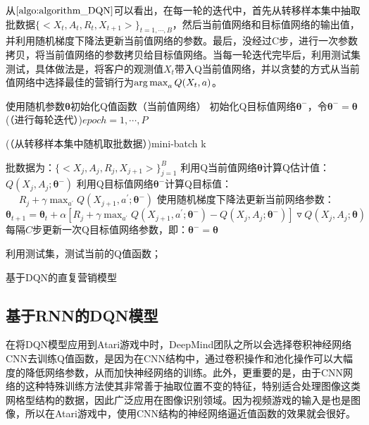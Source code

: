 从$\ref{algo:algorithm_DQN}$可以看出，在每一轮的迭代中，首先从转移样本集中抽取批数据$\{<X_{t}, A_{t}, R_{t}, X_{t+1}>\}_{t=1,\cdots,B}$，然后当前值网络和目标值网络的输出值，并利用随机梯度下降法更新当前值网络的参数。最后，没经过C步，进行一次参数拷贝，将当前值网络的参数拷贝给目标值网络。当每一轮迭代完毕后，利用测试集测试，具体做法是，将客户的观测值$X_{t}$带入Q当前值网络，并以贪婪的方式从当前值网络中选择最佳的营销行为$\operatorname*{arg\,max}_{a}Q(X_{t},a)$。

\begin{algorithm}[htbp]
 \small
 \SetAlgoLined

 使用随机参数$\bm{\theta}$初始化Q值函数（当前值网络）\;
 初始化Q目标值网络$\bm{\theta}^{-}$，令$\bm{\theta}^{-}=\bm{\theta}$\;
 \For(（进行每轮迭代）){$epoch=1,\cdots, P$}{
  \For(（从转移样本集中随机取批数据）){mini-batch k}{

    批数据为：$\{<X_{j}, A_{j}, R_{j}, X_{j+1}>\}_{j=1}^{B}$\;
    利用Q当前值网络$\bm{\theta}$计算Q估计值：$Q(X_{j}, A_{j};\bm{\theta}^{-})$\;
    利用Q目标值网络$\bm{\theta}^{-}$计算Q目标值：\\
     $\quad$ $R_{j}+\gamma \max_{a^{'}}Q(X_{j+1},a^{'};\bm{\theta}^{-})$\;
    使用随机梯度下降法更新当前网络参数：
    $\bm{\theta}_{t+1}=\bm{\theta}_{t}+\alpha[R_{j}+\gamma \max_{a^{'}}Q(X_{j+1},a^{'};\bm{\theta}^{-})-Q(X_{j}, A_{j};\bm{\theta}^{-})]\triangledown Q(X_{j}, A_{j};\bm{\theta})$\;
    每隔$C$步更新一次Q目标值网络参数，即：$\bm{\theta}^{-}=\bm{\theta}$\;
    }
    利用测试集，测试当前的Q值函数；
 }
 \caption{基于DQN的直复营销模型}
 \label{algo:algorithm_DQN}
 \end{algorithm}


\subsection{基于RNN的DQN模型}
在将DQN模型应用到Atari游戏中时\citep{mnih2013playing}，DeepMind团队之所以会选择卷积神经网络CNN去训练Q值函数，是因为在CNN结构中，通过卷积操作和池化操作可以大幅度的降低网络参数，从而加快神经网络的训练。此外，更重要的是，由于CNN网络的这种特殊训练方法使其非常善于抽取位置不变的特征，特别适合处理图像这类网格型结构的数据，因此广泛应用在图像识别领域。因为视频游戏的输入是也是图像，所以在Atari游戏中，使用CNN结构的神经网络逼近值函数的效果就会很好。

